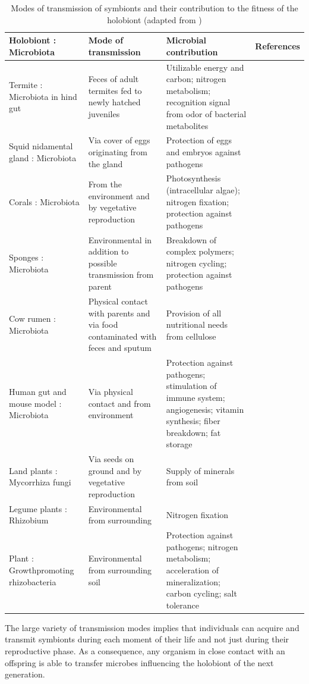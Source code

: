 \begin{table}
\centering
\scriptsize
\begin{tabular}{ p{} p{} p{} p{} }
\hline
Holobiont : Microbiota & Mode of transmission & Microbial contribution & References \\ \hline \hline
Termite : Microbiota in hind gut & Feces of adult termites fed to newly hatched juveniles & Utilizable energy and carbon; nitrogen metabolism; recognition signal from odor of bacterial metabolites & \cite{abe2000termites, minkley2006nest} \\
Squid nidamental gland : Microbiota & Via cover of eggs originating from the gland & Protection of eggs and embryos against pathogens & \cite{kaufman1998bacterial, barbieri2001phylogenetic} \\
Corals : Microbiota & From the environment and by vegetative reproduction & Photosynthesis (intracellular algae); nitrogen fixation; protection against pathogens & \cite{rohwer2002diversity, buddemeier2004adaptive, rosenberg2007role} \\
Sponges : Microbiota & Environmental in addition to possible transmission from parent & Breakdown of complex polymers; nitrogen cycling; protection against pathogens & \cite{webster2001phylogenetic, hickman2005have, taylor2007sponge} \\
Cow rumen : Microbiota & Physical contact with parents and via food contaminated with feces and sputum & Provision of all nutritional needs from cellulose & \cite{dehority2003rumen, russell2001factors} \\
Human gut and mouse model : Microbiota & Via physical contact and from environment & Protection against pathogens; stimulation of immune system; angiogenesis; vitamin synthesis; fiber breakdown; fat storage & \cite{hooper2002host, o2006gut, ley2006ecological, xu2007evolution} \\
Land plants : Mycorrhiza fungi & Via seeds on ground and by vegetative reproduction & Supply of minerals from soil & \cite{wilkinson2001mycorrhizal, wang2006phylogenetic} \\
Legume plants : Rhizobium & Environmental from surrounding & Nitrogen fixation & \cite{stougaard2000regulators, jones2007rhizobial} \\
Plant : Growthpromoting rhizobacteria & Environmental from surrounding soil & Protection against pathogens; nitrogen metabolism; acceleration of mineralization; carbon cycling; salt tolerance & \cite{smith1999genetic, somers2004rhizosphere, singh2004unravelling} \\
\hline
\end{tabular}
\caption{Modes of transmission of symbionts and their contribution to the fitness of the holobiont (adapted from \cite{zilber2008role}) \label{tab:transm}}
\end{table}
The large variety of transmission modes implies that individuals can acquire and transmit symbionts during each moment of their life and not just during their reproductive phase. As a consequence, any organism in close contact with an offspring is able to transfer microbes influencing the holobiont of the next generation.\\

